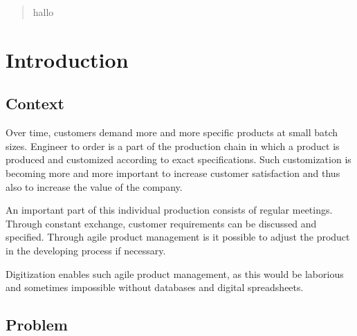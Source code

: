 \begin{abstract}
    hallo
    ~\cite{Hackenberg2014}~\cite{Legat2014}~\cite{Teufl2015}
\end{abstract}

\section{Introduction}
    \label{sec:introduction}


    \subsection*{Context}
    
    Over time, customers demand more and more specific products at small batch sizes.
    Engineer to order is a part of the production chain in which a product is produced and customized according to exact specifications.
    Such customization is becoming more and more important to increase customer satisfaction and thus also to increase the value of the company.

    An important part of this individual production consists of regular meetings. Through constant exchange, customer requirements can be discussed and specified.
    Through agile product management is it possible
    to adjust the product in the developing process if necessary. 

    Digitization enables such agile product management, as this would be laborious and sometimes impossible without databases and digital spreadsheets.  

    \subsection*{Problem}

